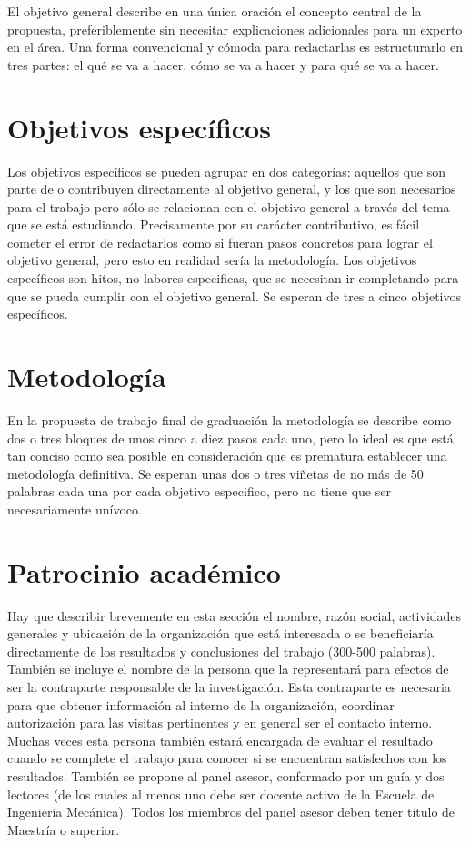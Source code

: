\documentclass[letterpaper,11pt]{Proposal}
\begin{document}
El objetivo general describe en una única oración el concepto central de la propuesta, preferiblemente sin necesitar explicaciones adicionales para un experto en el área. Una forma convencional y cómoda para redactarlas es estructurarlo en tres partes: el qué se va a hacer, cómo se va a hacer y para qué se va a hacer.

\section{Objetivos específicos}

Los objetivos específicos se pueden agrupar en dos categorías: aquellos que son parte de o contribuyen directamente al objetivo general, y los que son necesarios para el trabajo pero sólo se relacionan con el objetivo general a través del tema que se está estudiando. Precisamente por su carácter contributivo, es fácil cometer el error de redactarlos como si fueran pasos concretos para lograr el objetivo general, pero esto en realidad sería la metodología. Los objetivos específicos son hitos, no labores especificas, que se necesitan ir completando para que se pueda cumplir con el objetivo general. Se esperan de tres a cinco objetivos específicos. 

\section{Metodología}

En la propuesta de trabajo final de graduación la metodología se describe como dos o tres bloques de unos cinco a diez pasos cada uno, pero lo ideal es que está tan conciso como sea posible en consideración que es prematura establecer una metodología definitiva. Se esperan unas dos o tres viñetas de no más de 50 palabras cada una por cada objetivo especifico, pero no tiene que ser necesariamente unívoco.

\section{Patrocinio académico}

Hay que describir brevemente en esta sección el nombre, razón social, actividades generales y ubicación de la organización que está interesada o se beneficiaría directamente de los resultados y conclusiones del trabajo (300-500 palabras). También se incluye el nombre de la persona que la representará para efectos de ser la contraparte responsable de la investigación. Esta contraparte es necesaria para que obtener información al interno de la organización, coordinar autorización para las visitas pertinentes y en general ser el contacto interno. Muchas veces esta persona también estará encargada de evaluar el resultado cuando se complete el trabajo para conocer si se encuentran satisfechos con los resultados.
También se propone al panel asesor, conformado por un guía y dos lectores (de los cuales al menos uno debe ser docente activo de la Escuela de Ingeniería Mecánica). Todos los miembros del panel asesor deben tener título de Maestría o superior.
\end{document}
